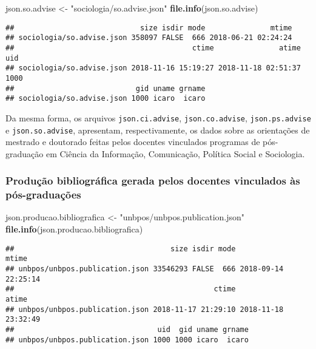 \documentclass[]{article}
\newenvironment{Shaded}{\begin{snugshade}}{\end{snugshade}}
\newcommand{\KeywordTok}[1]{\textcolor[rgb]{0.13,0.29,0.53}{\textbf{#1}}}
\newcommand{\StringTok}[1]{\textcolor[rgb]{0.31,0.60,0.02}{#1}}
\newcommand{\NormalTok}[1]{#1}
\begin{document}
\begin{Shaded}
\begin{Highlighting}[]
\NormalTok{json.so.advise <-}\StringTok{ "sociologia/so.advise.json"}
\KeywordTok{file.info}\NormalTok{(json.so.advise)}
\end{Highlighting}
\end{Shaded}

\begin{verbatim}
##                             size isdir mode               mtime
## sociologia/so.advise.json 358097 FALSE  666 2018-06-21 02:24:24
##                                         ctime               atime  uid
## sociologia/so.advise.json 2018-11-16 15:19:27 2018-11-18 02:51:37 1000
##                            gid uname grname
## sociologia/so.advise.json 1000 icaro  icaro
\end{verbatim}

Da mesma forma, os arquivos \texttt{json.ci.advise},
\texttt{json.co.advise}, \texttt{json.ps.advise} e
\texttt{json.so.advise}, apresentam, respectivamente, os dados sobre as
orientações de mestrado e doutorado feitas pelos docentes vinculados
programas de pós-graduação em Ciência da Informação, Comunicação,
Política Social e Sociologia.

\subsubsection{Produção bibliográfica gerada pelos docentes vinculados
às
pós-graduações}\label{producao-bibliografica-gerada-pelos-docentes-vinculados-as-pos-graduacoes}

\begin{Shaded}
\begin{Highlighting}[]
\NormalTok{json.producao.bibliografica <-}\StringTok{ "unbpos/unbpos.publication.json"}
\KeywordTok{file.info}\NormalTok{(json.producao.bibliografica) }
\end{Highlighting}
\end{Shaded}

\begin{verbatim}
##                                    size isdir mode               mtime
## unbpos/unbpos.publication.json 33546293 FALSE  666 2018-09-14 22:25:14
##                                              ctime               atime
## unbpos/unbpos.publication.json 2018-11-17 21:29:10 2018-11-18 23:32:49
##                                 uid  gid uname grname
## unbpos/unbpos.publication.json 1000 1000 icaro  icaro
\end{verbatim}
\end{document}
